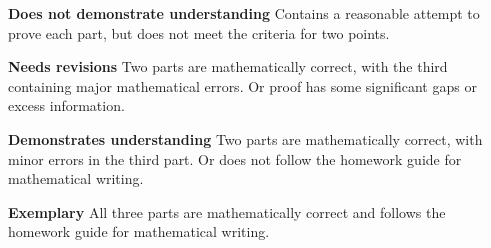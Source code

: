 \documentclass[letterpaper, 11 pt]{../ximera}
\begin{document}
\begin{problem}
\begin{solution}
    \end{solution}
    
    \begin{writeRubric}
        \item \textbf{Does not demonstrate understanding}
        Contains a reasonable attempt to prove each part, but does not meet the criteria for two points.
        \item \textbf{Needs revisions}
        Two parts are mathematically correct, with the third containing major mathematical errors. Or proof has some significant gaps or excess information.
        \item \textbf{Demonstrates understanding}
        Two parts are mathematically correct, with minor errors in the third part. Or does not follow the homework guide for mathematical writing.
        \item \textbf{Exemplary}
        All three parts are mathematically correct and follows the homework guide for mathematical writing.
    \end{writeRubric}
%
\end{problem}
\end{document}
